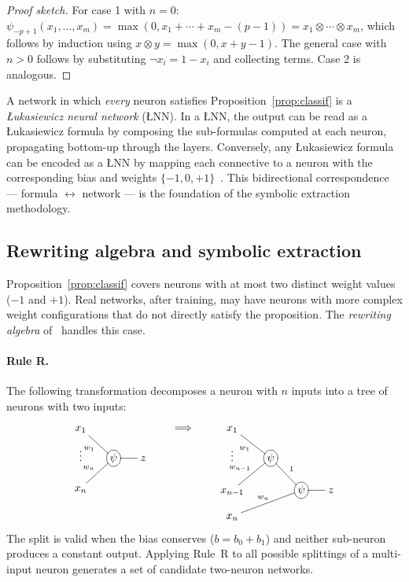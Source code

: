 \documentclass[12pt,a4paper]{article}
\newcommand{\tnorm}{\otimes}      %
\newcommand{\LNN}{\L{}NN}
\begin{document}
\begin{proof}[Proof sketch]
For case 1 with $n=0$: $\psi_{-p+1}(x_1,\ldots,x_m)
= \max(0, x_1+\cdots+x_m - (p-1)) = x_1 \tnorm \cdots \tnorm x_m$,
which follows by induction using $x \tnorm y = \max(0,x+y-1)$.
The general case with $n > 0$ follows by substituting $\neg x_i = 1 - x_i$
and collecting terms.
Case 2 is analogous.
\end{proof}

A network in which \emph{every} neuron satisfies Proposition~\ref{prop:classif}
is a \emph{\L{}ukasiewicz neural network} (\LNN{}).
In a \LNN{}, the output can be read as a \L{}ukasiewicz formula by composing
the sub-formulas computed at each neuron, propagating bottom-up through the
layers.
Conversely, any \L{}ukasiewicz formula can be encoded as a \LNN{} by mapping
each connective to a neuron with the corresponding bias and weights
$\{-1, 0, +1\}$~\cite{amato2002}.
This bidirectional correspondence --- formula $\leftrightarrow$ network ---
is the foundation of the symbolic extraction methodology.

\subsection{Rewriting algebra and symbolic extraction}
\label{ssec:rewriting}

Proposition~\ref{prop:classif} covers neurons with at most two distinct weight
values ($-1$ and $+1$).
Real networks, after training, may have neurons with more complex weight
configurations that do not directly satisfy the proposition.
The \emph{rewriting algebra} of~\cite{leandro2009} handles this case.

\paragraph{Rule R.}
The following transformation decomposes a neuron with $n$ inputs into a tree
of neurons with two inputs:
\[
\xymatrix @R=10pt @C=15pt {
  x_1 \ar@{-}[dr]_{w_1} & \\
  \vdots & *+[o][F-]{\psi} \ar@{-}[r] & z \\
  x_n \ar@{-}[ur]^{w_n} &
}
\qquad \Longrightarrow \qquad
\xymatrix @R=10pt @C=15pt {
  x_1 \ar@{-}[dr]_{w_1} & \\
  \vdots & *+[o][F-]{\psi} \ar@{-}[rd]^{1} & \\
  x_{n-1} \ar@{-}[ur]^{w_{n-1}} & & *+[o][F-]{\psi} \ar@{-}[r] & z \\
  x_n \ar@{-}[rru]^{w_n} & &
}
\]
The split is valid when the bias conserves ($b = b_0 + b_1$) and neither
sub-neuron produces a constant output.
Applying Rule~R to all possible splittings of a multi-input neuron generates
a set of candidate two-neuron networks.
\end{document}
